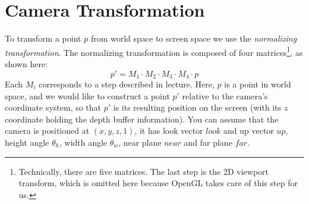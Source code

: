 \documentclass[10pt,twocolumn]{article}
\begin{document}
\section{Camera Transformation}
To transform a point $p$ from world space to screen space we use the \emph{normalizing transformation}. The normalizing transformation is composed of four matrices\footnote{Technically, there are five matrices. The last step is the 2D viewport transform, which is omitted here because OpenGL takes care of this step for us.}, as shown here:
\[p' = M_1 \cdot M_2 \cdot M_3 \cdot M_4 \cdot p\]
Each $M_i$ corresponds to a step described in lecture. Here, $p$ is a point in world space, and we would like to construct a point $p'$ relative to the camera's coordinate system, so that $p'$ is its resulting position on the screen (with its $z$ coordinate holding the depth buffer information). You can assume that the camera is positioned at $(x,y,z,1)$, it has look vector $look$ and up vector $up$, height angle $\theta_h$, width angle $\theta_w$, near plane $near$ and far plane $far$.
\end{document}
